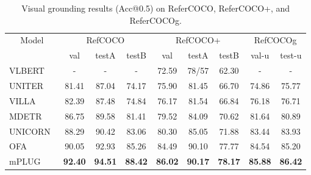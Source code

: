 \documentclass[11pt]{article}
\begin{document}
\begin{table*}[t]
\centering
\begin{tabular}{@{}lcccccccc@{}}
\toprule
\multicolumn{1}{c}{\multirow{2}{*}{Model}} & \multicolumn{3}{c}{RefCOCO} & \multicolumn{3}{c}{RefCOCO+} & \multicolumn{2}{c}{RefCOCOg} \\
\multicolumn{1}{c}{}                       & val     & testA   & testB   & val      & testA   & testB   & val-u        & test-u        \\ \midrule
VLBERT~\cite{lu2019vilbert}\                                    & -       & -       & -       & 72.59    & 78/57   & 62.30   & -            & -             \\
UNITER~\cite{chen2020uniter}                                     & 81.41   & 87.04   & 74.17   & 75.90    & 81.45   & 66.70   & 74.86        & 75.77         \\
VILLA~\cite{DBLP:conf/nips/Gan0LZ0020}                                    & 82.39   & 87.48   & 74.84   & 76.17    & 81.54   & 66.84   & 76.18        & 76.71         \\
MDETR~\cite{DBLP:conf/iccv/KamathSLSMC21}                                      & 86.75   & 89.58   & 81.41   & 79.52    & 84.09   & 70.62   & 81.64        & 80.89         \\
UNICORN~\cite{DBLP:journals/corr/abs-2111-12085}                                    & 88.29   & 90.42   & 83.06   & 80.30    & 85.05   & 71.88   & 83.44        & 83.93         \\
OFA~\cite{wang2022OFA}                                        & 90.05   & 92.93   & 85.26   & 84.49    & 90.10   & 77.77   & 84.54        & 85.20         \\ \midrule
mPLUG                                 & \textbf{92.40}   & \textbf{94.51}   & \textbf{88.42}   &  \textbf{86.02}   &  \textbf{90.17}   &  \textbf{78.17}   &    \textbf{85.88}   & \textbf{86.42}              \\ \bottomrule
\end{tabular}

\caption{Visual grounding results (Acc@0.5) on ReferCOCO, ReferCOCO+, and ReferCOCOg.}
\label{tab:visual_grounding}
\end{table*}
\end{document}
